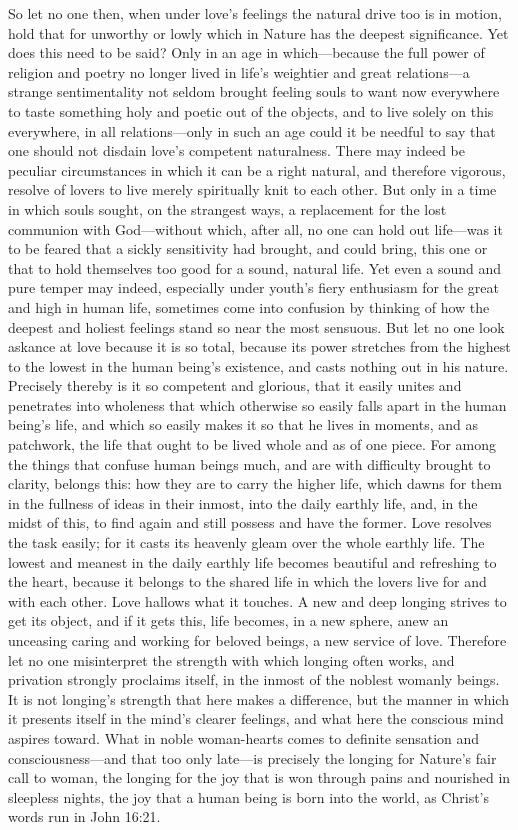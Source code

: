 \documentclass[12pt,a4paper]{book}
\begin{document}
So let no one then, when under love's feelings the natural drive too is in
motion, hold that for unworthy or lowly which in Nature has the deepest
significance. Yet does this need to be said? Only in an age in
which---because the full power of religion and poetry no longer lived in
life's weightier and great relations---a strange sentimentality not seldom
brought feeling souls to want now everywhere to taste something holy and
poetic out of the objects, and to live solely on this everywhere, in all
relations---only in such an age could it be needful to say that one should
not disdain love's competent naturalness. There may indeed be peculiar
circumstances in which it can be a right natural, and therefore vigorous,
resolve of lovers to live merely spiritually knit to each other. But only
in a time in which souls sought, on the strangest ways, a replacement for
the lost communion with God---without which, after all, no one can hold out
life---was it to be feared that a sickly sensitivity had brought, and could
bring, this one or that to hold themselves too good for a sound, natural
life. Yet even a sound and pure temper may indeed, especially under youth's
fiery enthusiasm for the great and high in human life, sometimes come into
confusion by thinking of how the deepest and holiest feelings stand so near
the most sensuous. But let no one look askance at love because it is so
total, because its power stretches from the highest to the lowest in the
human being's existence, and casts nothing out in his nature. Precisely
thereby is it so competent and glorious, that it easily unites and
penetrates into wholeness that which otherwise so easily falls apart in the
human being's life, and which so easily makes it so that he lives in
moments, and as patchwork, the life that ought to be lived whole and as of
one piece. For among the things that confuse human beings much, and are
with difficulty brought to clarity, belongs this: how they are to carry the
higher life, which dawns for them in the fullness of ideas in their inmost,
into the daily earthly life, and, in the midst of this, to find again and
still possess and have the former. Love resolves the task easily; for it
casts its heavenly gleam over the whole earthly life. The lowest and
meanest in the daily earthly life becomes beautiful and refreshing to the
heart, because it belongs to the shared life in which the lovers live for
and with each other. Love hallows what it touches. A new and deep longing
strives to get its object, and if it gets this, life becomes, in a new
sphere, anew an unceasing caring and working for beloved beings, a new
service of love. Therefore let no one misinterpret the strength with which
longing often works, and privation strongly proclaims itself, in the inmost
of the noblest womanly beings. It is not longing's strength that here makes
a difference, but the manner in which it presents itself in the mind's
clearer feelings, and what here the conscious mind aspires toward. What in
noble woman-hearts comes to definite sensation and consciousness---and that
too only late---is precisely the longing for Nature's fair call to woman,
the longing for the joy that is won through pains and nourished in
sleepless nights, the joy that a human being is born into the world, as
Christ's words run in John 16:21.
\end{document}
